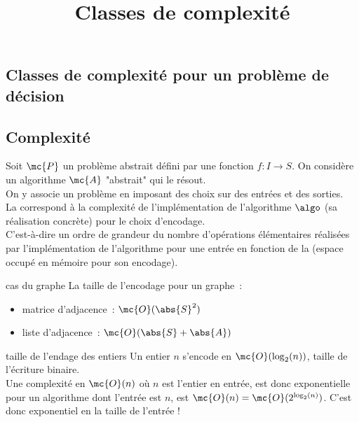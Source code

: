 

\begin{adjustwidth}{-3cm}{-3cm}

\setcounter{chapitre}{11}
\title{Classes de complexité}
\maketitle
\section{Classes de complexité pour un problème de décision}
\subsection{Complexité}

\begin{definition}{}{}
    Soit $\mc{P}$ un problème abstrait défini par une fonction $f:I\to S$. On considère un algorithme $\mc{A}$ "abstrait" qui le résout.\\
    On y associe un problème  en imposant des choix sur  des entrées et des sorties.\\
    La  correspond à la complexité de l'implémentation de l'algorithme $\algo$ (sa réalisation concrète) pour le choix d'encodage.\\
    C'est-à-dire un ordre de grandeur du nombre d'opérations élémentaires réalisées par l'implémentation de l'algorithme pour une entrée en fonction de la  (espace occupé en mémoire pour son encodage).
\end{definition}

\begin{remarque}{}{cas du graphe}
    La taille de l'encodage pour un graphe~:
    \begin{itemize}
        \item matrice d'adjacence~: $\mc{O}(\abs{S}^2)$
        \item liste d'adjacence~: $\mc{O}(\abs{S} + \abs{A})$
    \end{itemize}
\end{remarque}

\begin{exemple}{}{taille de l'endage des entiers}
    Un entier $n$ s'encode en $\mc{O}(\log_2(n))$, taille de l'écriture binaire.\\
    Une complexité en $\mc{O}(n)$ où $n$ est l'entier en entrée, est donc exponentielle pour un algorithme dont l'entrée est $n$, est $\mc{O}(n) = \mc{O}(2^{\log_2(n)})$. C'est donc exponentiel en la taille de l'entrée !
\end{exemple}


\end{adjustwidth}
